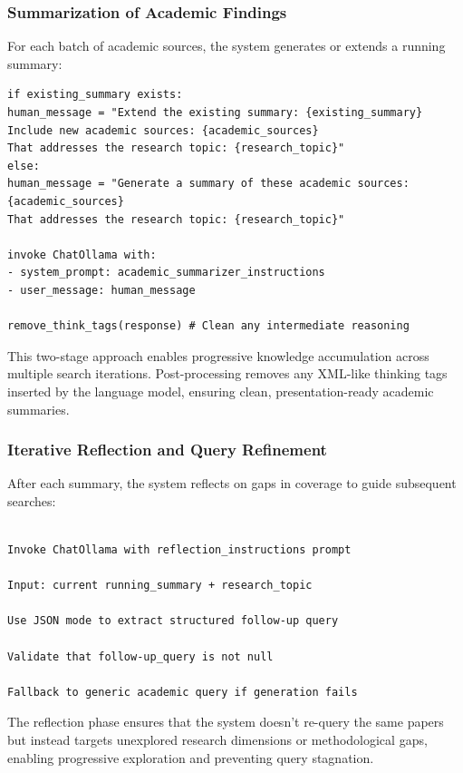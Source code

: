 \subsubsection{Summarization of Academic Findings}

For each batch of academic sources, the system generates or extends a running summary:

\begin{lstlisting}
if existing_summary exists:
human_message = "Extend the existing summary: {existing_summary}
Include new academic sources: {academic_sources}
That addresses the research topic: {research_topic}"
else:
human_message = "Generate a summary of these academic sources:
{academic_sources}
That addresses the research topic: {research_topic}"

invoke ChatOllama with:
- system_prompt: academic_summarizer_instructions
- user_message: human_message

remove_think_tags(response) # Clean any intermediate reasoning
\end{lstlisting}

This two-stage approach enables progressive knowledge accumulation across multiple search iterations. Post-processing removes any XML-like thinking tags inserted by the language model, ensuring clean, presentation-ready academic summaries.

\subsubsection{Iterative Reflection and Query Refinement}

After each summary, the system reflects on gaps in coverage to guide subsequent searches:

\begin{lstlisting}

Invoke ChatOllama with reflection_instructions prompt

Input: current running_summary + research_topic

Use JSON mode to extract structured follow-up query

Validate that follow-up_query is not null

Fallback to generic academic query if generation fails
\end{lstlisting}

The reflection phase ensures that the system doesn't re-query the same papers but instead targets unexplored research dimensions or methodological gaps, enabling progressive exploration and preventing query stagnation.

